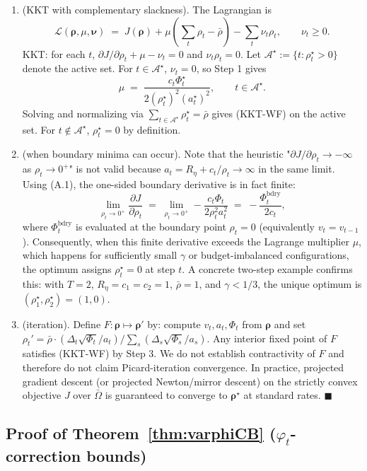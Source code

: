\documentclass{article}
\begin{document}
\begin{enumerate}
    \item[Step 3] (KKT with complementary slackness). The Lagrangian is
    $$\mathcal{L}(\boldsymbol\rho, \mu, \boldsymbol\nu) \;=\; J(\boldsymbol\rho) + \mu\!\left(\textstyle\sum_t \rho_t - \bar\rho\right) - \sum_t \nu_t \rho_t, \qquad \nu_t \ge 0.$$
    KKT: for each $t$, $\partial J/\partial\rho_t + \mu - \nu_t = 0$ and $\nu_t \rho_t = 0$. Let $\mathcal{A}^\star := \{t : \rho_t^\star > 0\}$ denote the active set. For $t \in \mathcal{A}^\star$, $\nu_t = 0$, so Step 1 gives
    $$\mu \;=\; \frac{c_t \Phi_t^\star}{2 (\rho_t^\star)^2 (a_t^\star)^2}, \qquad t \in \mathcal{A}^\star.$$
    Solving and normalizing via $\sum_{t\in\mathcal{A}^\star} \rho_t^\star = \bar\rho$ gives (KKT-WF) on the active set. For $t \notin \mathcal{A}^\star$, $\rho_t^\star = 0$ by definition.
    \item[Step 4] (when boundary minima can occur). Note that the heuristic "$\partial J/\partial\rho_t \to -\infty$ as $\rho_t \to 0^+$" is not valid because $a_t = R_\eta + c_t/\rho_t \to \infty$ in the same limit. Using (A.1), the one-sided boundary derivative is in fact finite:
    $$\lim_{\rho_t \to 0^+} \frac{\partial J}{\partial \rho_t} \;=\; \lim_{\rho_t \to 0^+} -\frac{c_t \Phi_t}{2\rho_t^2 a_t^2} \;=\; -\frac{\Phi_t^{\text{bdry}}}{2 c_t},$$
    where $\Phi_t^{\text{bdry}}$ is evaluated at the boundary point $\rho_t = 0$ (equivalently $v_t = v_{t-1}$). Consequently, when this finite derivative exceeds the Lagrange multiplier $\mu$, which happens for sufficiently small $\gamma$ or budget-imbalanced configurations, the optimum assigns $\rho_t^\star = 0$ at step $t$. A concrete two-step example confirms this: with $T = 2$, $R_\eta = c_1 = c_2 = 1$, $\bar\rho = 1$, and $\gamma < 1/3$, the unique optimum is $(\rho_1^\star, \rho_2^\star) = (1, 0)$.
    \item[Step 5] (iteration). Define $F: \boldsymbol{\rho} \mapsto \boldsymbol{\rho}'$ by: compute $v_t, a_t, \Phi_t$ from $\boldsymbol{\rho}$ and set $\rho_t' = \bar\rho \cdot (\Delta_t\sqrt{\Phi_t}/a_t)/\sum_s(\Delta_s\sqrt{\Phi_s}/a_s)$. Any interior fixed point of $F$ satisfies (KKT-WF) by Step 3. We do not establish contractivity of $F$ and therefore do not claim Picard-iteration convergence. In practice, projected gradient descent (or projected Newton/mirror descent) on the strictly convex objective $J$ over $\bar\Omega$ is guaranteed to converge to $\boldsymbol{\rho}^\star$ at standard rates. $\blacksquare$
\end{enumerate}


\subsection{Proof of Theorem~\ref{thm:varphiCB} ($\varphi_t$-correction bounds)}\label{app:varphiCB}
\end{document}
